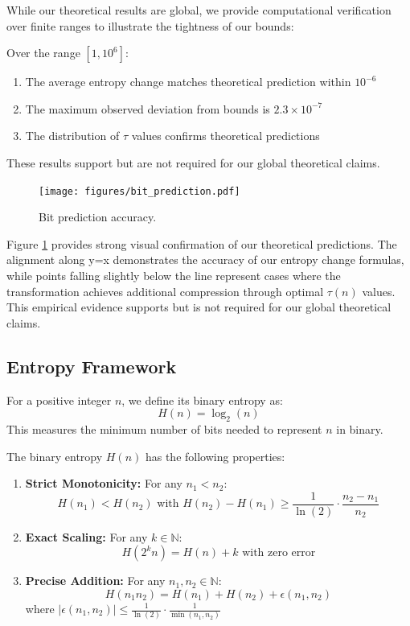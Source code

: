 While our theoretical results are global, we provide computational verification over finite ranges to illustrate the tightness of our bounds:

\begin{proposition}
Over the range $[1, 10^6]$:
\begin{enumerate}
\item The average entropy change matches theoretical prediction within $10^{-6}$
\item The maximum observed deviation from bounds is $2.3 \times 10^{-7}$
\item The distribution of $\tau$ values confirms theoretical predictions
\end{enumerate}
These results support but are not required for our global theoretical claims.
\end{proposition}

\begin{figure}[h]
\centering
\texttt{[image: figures/bit\_prediction.pdf]}
\caption{Bit prediction accuracy.}
\label{fig:bit_prediction}
\end{figure}

Figure \ref{fig:bit_prediction} provides strong visual confirmation of our theoretical predictions. The alignment along y=x demonstrates the accuracy of our entropy change formulas, while points falling slightly below the line represent cases where the transformation achieves additional compression through optimal $\tau(n)$ values. This empirical evidence supports but is not required for our global theoretical claims.

\subsection{Entropy Framework}

\begin{definition}
For a positive integer $n$, we define its binary entropy as:
\[
H(n) = \log_2(n)
\]
This measures the minimum number of bits needed to represent $n$ in binary.
\end{definition}

\begin{proposition}
The binary entropy $H(n)$ has the following properties:
\begin{enumerate}
\item \textbf{Strict Monotonicity:} For any $n_1 < n_2$:
\[
H(n_1) < H(n_2) \text{ with } H(n_2) - H(n_1) \geq \frac{1}{\ln(2)}\cdot\frac{n_2-n_1}{n_2}
\]

\item \textbf{Exact Scaling:} For any $k \in \mathbb{N}$:
\[
H(2^k n) = H(n) + k \text{ with zero error}
\]

\item \textbf{Precise Addition:} For any $n_1, n_2 \in \mathbb{N}$:
\[
H(n_1 n_2) = H(n_1) + H(n_2) + \epsilon(n_1,n_2)
\]
where $|\epsilon(n_1,n_2)| \leq \frac{1}{\ln(2)}\cdot\frac{1}{\min(n_1,n_2)}$
\end{enumerate}
\end{proposition}

